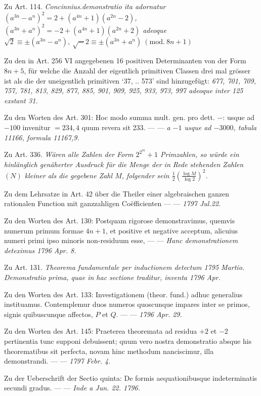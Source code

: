 Zu Art. 114. \textit{Concinnius.demonstratio ita adornatur \((a^{3n}-a^n)^2=2+(a^{4n}+1)(a^{2n}-2)\), \((a^{3n}+a^n)^2=-2+(a^{4n}+1)(a^{2n}+2)\) adeoque \(\surd2\equiv\pm(a^{3n}-a^n),\ \surd-2\equiv\pm(a^{3n}+a^n)\ (\mathrm{mod.}\ 8n+1)\)}


Zu den in Art. 256 VI angegebenen 16 positiven Determinanten von der Form \(8n+5\), für welche die Anzahl der eigentlich primitiven Classen drei mal grösser ist als die der uneigentlich primitiven ‘37, .. 573’ sind hinzugefügt: \textit{677, 701, 709, 757, 781, 813, 829, 877, 885, 901, 909, 925, 933, 973, 997 adeoque inter 125 exstant 31.}


Zu den Worten des Art. 301: Hoc modo summa mult. gen. pro dett. \(-\): usque ad \(-100\) invenitur \(=234,4\) quum revera sit 233. — — \textit{a \(-1\) usque ad \(-3000\), tabula 11166, formula 11167,9.}


Zu Art. 336. \textit{Wären alle Zahlen der Form \(2^{2^m}+1\) Primzahlen, so würde ein hinlänglich genäherter Ausdruck für die Menge der in Rede stehenden Zahlen \((N)\) kleiner als die gegebene Zahl \(M\), folgender sein \(\frac12\left(\frac{\log M}{\log2}\right)^2\).}


Zu dem Lehrsatze in Art. 42 über die Theiler einer algebraischen ganzen rationalen Function mit ganzzahligen Coëfficienten — — \textit{1797 Jul.22.}


Zu den Worten des Art. 130: Postquam rigorose demonstravimus, quemvis numerum primum formae \(4n+1\), et positive et negative acceptum, alicuius numeri primi ipso minoris non-residuum esse, — — \textit{Hanc demonstrationem deteximus 1796 Apr. 8.}


Zu Art. 131. \textit{Theorema fundamentale per inductionem detectum 1795 Martio. Demonstratio prima, quae in hac sectione traditur, inventa 1796 Apr.}



Zu den Worten des Art. 133: Investigationem (theor. fund.) adhuc generalius instituamus. Contemplemur duos numeros quoscunque impares inter se primos, signis quibuscunque affectos, \(P\) et \(Q\). — — \textit{1796 Apr. 29.}


Zu den Worten des Art. 145: Praeterea theoremata ad residua \(+2\) et \(-2\) pertinentia tunc supponi debuissent; quum vero nostra demonstratio absque his theorematibus sit perfecta, novam hinc methodum nanciscimur, illa demonstrandi. — — \textit{1797 Febr. 4.}


Zu der Ueberschrift der Sectio quinta: De formis aequationibusque indeterminatis secundi gradus. — — \textit{Inde a Jun. 22. 1796.}


